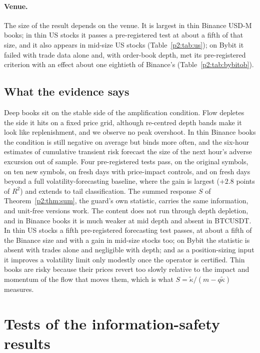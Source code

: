 \paragraph{Venue.} The size of the result depends on the venue. It is largest in thin Binance USD-M books; in thin US stocks it passes a pre-registered test at about a fifth of that size, and it also appears in mid-size US stocks (Table~\ref{p2:tab:us}); on Bybit it failed with trade data alone and, with order-book depth, met its pre-registered criterion with an effect about one eightieth of Binance's (Table~\ref{p2:tab:bybitob}).

\subsection{What the evidence says}\label{p2:sec:thin_summary}
Deep books sit on the stable side of the amplification condition. Flow depletes the side it hits on a fixed price grid, although re-centred depth bands make it look like replenishment, and we observe no peak overshoot. In thin Binance books the condition is still negative on average but binds more often, and the six-hour estimates of cumulative transient risk forecast the size of the next hour's adverse excursion out of sample. Four pre-registered tests pass, on the original symbols, on ten new symbols, on fresh days with price-impact controls, and on fresh days beyond a full volatility-forecasting baseline, where the gain is largest ($+2.8$ points of $R^2$) and extends to tail classification. The summed response $S$ of Theorem~\ref{p2:thm:sum}, the guard's own statistic, carries the same information, and unit-free versions work. The content does not run through depth depletion, and in Binance books it is much weaker at mid depth and absent in BTCUSDT. In thin US stocks a fifth pre-registered forecasting test passes, at about a fifth of the Binance size and with a gain in mid-size stocks too; on Bybit the statistic is absent with trades alone and negligible with depth; and as a position-sizing input it improves a volatility limit only modestly once the operator is certified. Thin books are risky because their prices revert too slowly relative to the impact and momentum of the flow that moves them, which is what $S=\tilde\kappa/(m-q\tilde\kappa)$ measures.
\FloatBarrier
\section{Tests of the information-safety results}\label{p2:sec:istests}

